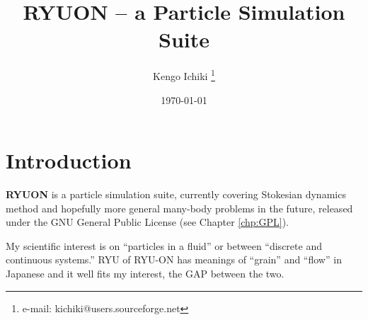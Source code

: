 \documentclass{book}
\begin{document}
\title{RYUON -- a Particle Simulation Suite}
\author{Kengo Ichiki
 \thanks{e-mail: kichiki@users.sourceforge.net}}
\date{\today}

\maketitle

\tableofcontents

\chapter{Introduction}
{\bf RYUON} is a particle simulation suite,
currently covering Stokesian dynamics method
and hopefully more general many-body problems in the future,
released under the GNU General Public License (see Chapter \ref{chp:GPL}).


My scientific interest is on ``particles in a fluid'' 
or between ``discrete and continuous systems.''
RYU of RYU-ON has meanings of ``grain'' and ``flow'' 
in Japanese and it well fits my interest, the GAP between the two.
\end{document}
